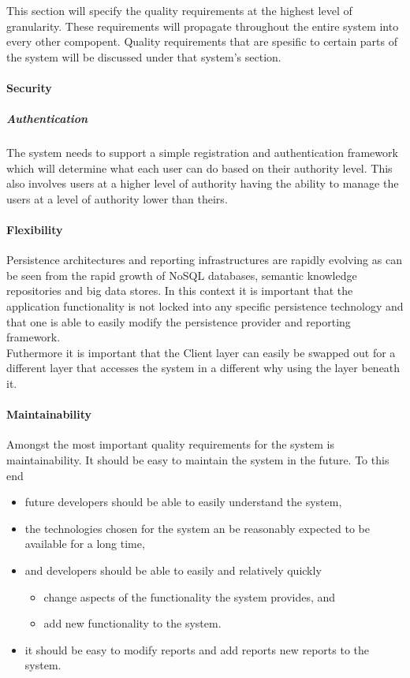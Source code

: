 This section will specify the quality requirements at the highest level of
granularity. These requirements will propagate throughout the entire system
into every other compopent. Quality requirements that are spesific to certain
parts of the system will be discussed under that system's section.
\paragraph{Security}
\subparagraph{Authentication}
The system needs to support a simple registration and authentication framework
which will determine what each user can do based on their authority level. This
also involves users at a higher level of authority having the ability to manage
the users at a level of authority lower than theirs.
\paragraph{Flexibility}
Persistence architectures and reporting infrastructures are rapidly evolving as can
be seen from the rapid growth of NoSQL databases, semantic knowledge repositories and big data
stores. In this context it is important that the application functionality is not locked into any
specific persistence technology and that one is able to easily modify the persistence provider and
reporting framework.\\
Futhermore it is important that the Client layer can easily be swapped out for a different
layer that accesses the system in a different why using the layer beneath it.
\paragraph{Maintainability}
Amongst the most important quality requirements for the system is
maintainability. It should be easy to maintain the system in the future. To this end

\begin{itemize}
\item future developers should be able to easily understand the system,
\item the technologies chosen for the system an be reasonably expected to be available for a long
time,
\item and developers should be able to easily and relatively quickly
	\begin{itemize}
		\item change aspects of the functionality the system provides, and
		\item add new functionality to the system.
	\end{itemize}
\item it should be easy to modify reports and add reports new reports to the system.
\end{itemize}

